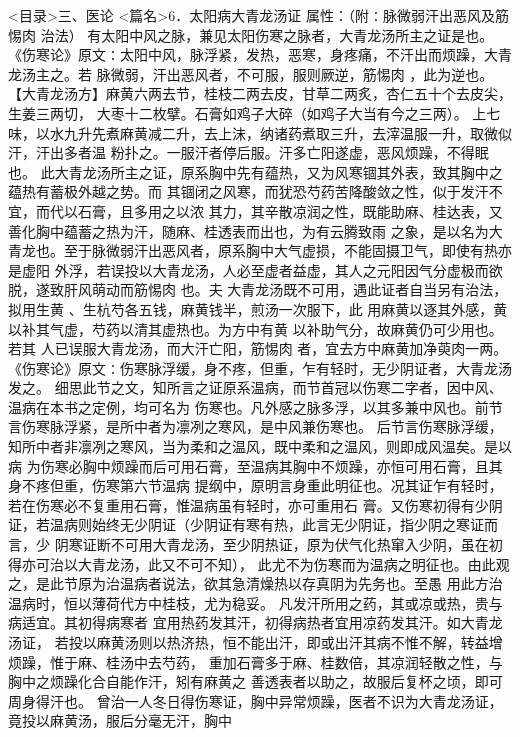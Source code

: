 \documentclass[a4paper,12pt,UTF8,twoside]{ctexbook}
\begin{document}
<目录>三、医论
<篇名>6．太阳病大青龙汤证
属性：（附∶脉微弱汗出恶风及筋惕肉 治法） 
有太阳中风之脉，兼见太阳伤寒之脉者，大青龙汤所主之证是也。 
《伤寒论》原文∶太阳中风，脉浮紧，发热，恶寒，身疼痛，不汗出而烦躁，大青龙汤主之。若 
脉微弱，汗出恶风者，不可服，服则厥逆，筋惕肉 ，此为逆也。 
【大青龙汤方】麻黄六两去节，桂枝二两去皮，甘草二两炙，杏仁五十个去皮尖，生姜三两切， 
大枣十二枚擘。石膏如鸡子大碎（如鸡子大当有今之三两）。 
上七味，以水九升先煮麻黄减二升，去上沫，纳诸药煮取三升，去滓温服一升，取微似汗，汗出多者温 
粉扑之。一服汗者停后服。汗多亡阳遂虚，恶风烦躁，不得眠也。 
此大青龙汤所主之证，原系胸中先有蕴热，又为风寒锢其外表，致其胸中之蕴热有蓄极外越之势。而 
其锢闭之风寒，而犹恐芍药苦降酸敛之性，似于发汗不宜，而代以石膏，且多用之以浓 
其力，其辛散凉润之性，既能助麻、桂达表，又善化胸中蕴蓄之热为汗，随麻、桂透表而出也，为有云腾致雨 
之象，是以名为大青龙也。至于脉微弱汗出恶风者，原系胸中大气虚损，不能固摄卫气，即使有热亦是虚阳 
外浮，若误投以大青龙汤，人必至虚者益虚，其人之元阳因气分虚极而欲脱，遂致肝风萌动而筋惕肉 也。夫 
大青龙汤既不可用，遇此证者自当另有治法，拟用生黄 、生杭芍各五钱，麻黄钱半，煎汤一次服下，此 
用麻黄以逐其外感，黄 以补其气虚，芍药以清其虚热也。为方中有黄 以补助气分，故麻黄仍可少用也。若其 
人已误服大青龙汤，而大汗亡阳，筋惕肉 者，宜去方中麻黄加净萸肉一两。 
《伤寒论》原文∶伤寒脉浮缓，身不疼，但重，乍有轻时，无少阴证者，大青龙汤发之。 
细思此节之文，知所言之证原系温病，而节首冠以伤寒二字者，因中风、温病在本书之定例，均可名为 
伤寒也。凡外感之脉多浮，以其多兼中风也。前节言伤寒脉浮紧，是所中者为凛冽之寒风，是中风兼伤寒也。 
后节言伤寒脉浮缓，知所中者非凛冽之寒风，当为柔和之温风，既中柔和之温风，则即成风温矣。是以病 
为伤寒必胸中烦躁而后可用石膏，至温病其胸中不烦躁，亦恒可用石膏，且其身不疼但重，伤寒第六节温病 
提纲中，原明言身重此明征也。况其证乍有轻时，若在伤寒必不复重用石膏，惟温病虽有轻时，亦可重用石 
膏。又伤寒初得有少阴证，若温病则始终无少阴证（少阴证有寒有热，此言无少阴证，指少阴之寒证而言，少 
阴寒证断不可用大青龙汤，至少阴热证，原为伏气化热窜入少阴，虽在初得亦可治以大青龙汤，此又不可不知）， 
此尤不为伤寒而为温病之明征也。由此观之，是此节原为治温病者说法，欲其急清燥热以存真阴为先务也。至愚 
用此方治温病时，恒以薄荷代方中桂枝，尤为稳妥。 
凡发汗所用之药，其或凉或热，贵与病适宜。其初得病寒者 
宜用热药发其汗，初得病热者宜用凉药发其汗。如大青龙汤证， 
若投以麻黄汤则以热济热，恒不能出汗，即或出汗其病不惟不解，转益增烦躁，惟于麻、桂汤中去芍药， 
重加石膏多于麻、桂数倍，其凉润轻散之性，与胸中之烦躁化合自能作汗，矧有麻黄之 
善透表者以助之，故服后复杯之顷，即可周身得汗也。 
曾治一人冬日得伤寒证，胸中异常烦躁，医者不识为大青龙汤证，竟投以麻黄汤，服后分毫无汗，胸中 
\end{document}
